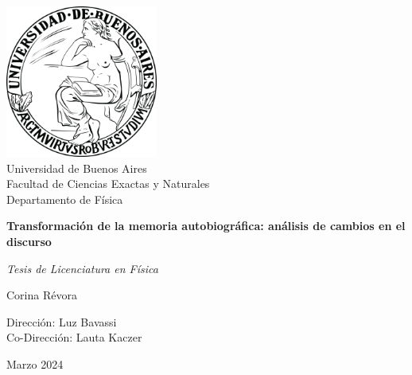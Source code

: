\thispagestyle{empty}
\begin{center}

{\includegraphics[width=5cm]{figures/UBA_logo.png}\\}
\vspace*{2mm}
{\large Universidad de Buenos Aires\\}
{\large Facultad de Ciencias Exactas y Naturales\\}
{\large Departamento de Física\\}


\vspace*{2cm}
{\huge \bf Transformación de la memoria autobiográfica: análisis de cambios en el discurso}


\vspace*{1cm}
{\it {\large Tesis de Licenciatura  en Física} 
}

\vspace*{0.8cm}


\vspace*{6mm}
{\Large Corina Révora\\}

\vspace*{10mm}
{\large Dirección: Luz Bavassi\\}
{\large Co-Dirección: Lauta Kaczer\\}


\vspace*{5mm}
{\large Marzo 2024\\}
\end{center}

